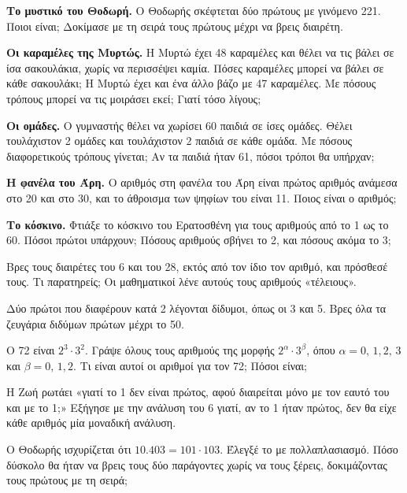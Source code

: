 \ex \textbf{Το μυστικό του Θοδωρή.} Ο Θοδωρής σκέφτεται δύο πρώτους με γινόμενο 221. Ποιοι είναι; Δοκίμασε με τη σειρά τους πρώτους μέχρι να βρεις διαιρέτη.

\ex \textbf{Οι καραμέλες της Μυρτώς.} Η Μυρτώ έχει 48 καραμέλες και θέλει να τις βάλει σε ίσα σακουλάκια, χωρίς να περισσέψει καμία. Πόσες καραμέλες μπορεί να βάλει σε κάθε σακουλάκι; Η Μυρτώ έχει και ένα άλλο βάζο με 47 καραμέλες. Με πόσους τρόπους μπορεί να τις μοιράσει εκεί; Γιατί τόσο λίγους;

\ex \textbf{Οι ομάδες.} Ο γυμναστής θέλει να χωρίσει 60 παιδιά σε ίσες ομάδες. Θέλει τουλάχιστον 2 ομάδες και τουλάχιστον 2 παιδιά σε κάθε ομάδα. Με πόσους διαφορετικούς τρόπους γίνεται; Αν τα παιδιά ήταν 61, πόσοι τρόποι θα υπήρχαν;

\ex \textbf{Η φανέλα του Άρη.} Ο αριθμός στη φανέλα του Άρη είναι πρώτος αριθμός ανάμεσα στο 20 και στο 30, και το άθροισμα των ψηφίων του είναι 11. Ποιος είναι ο αριθμός;

\ex \textbf{Το κόσκινο.} Φτιάξε το κόσκινο του Ερατοσθένη για τους αριθμούς από το 1 ως το 60. Πόσοι πρώτοι υπάρχουν; Πόσους αριθμούς σβήνει το 2, και πόσους ακόμα το 3;


\ex Βρες τους διαιρέτες του 6 και του 28, εκτός από τον ίδιο τον αριθμό, και πρόσθεσέ τους. Τι παρατηρείς; Οι μαθηματικοί λένε αυτούς τους αριθμούς «τέλειους».

\ex Δύο πρώτοι που διαφέρουν κατά 2 λέγονται δίδυμοι, όπως οι 3 και 5. Βρες όλα τα ζευγάρια διδύμων πρώτων μέχρι το 50.

\ex Ο 72 είναι $2^3\cdot 3^2$. Γράψε όλους τους αριθμούς της μορφής $2^{\alpha}\cdot 3^{\beta}$, όπου $\alpha=0,\,1,2,\,3$ και $\beta=0,\,1,2$. Τι είναι αυτοί οι αριθμοί για τον 72; Πόσοι είναι;

\ex Η Ζωή ρωτάει «γιατί το 1 δεν είναι πρώτος, αφού διαιρείται μόνο με τον εαυτό του και με το 1;» Εξήγησε με την ανάλυση του 6 γιατί, αν το 1 ήταν πρώτος, δεν θα είχε κάθε αριθμός μία μοναδική ανάλυση.

\ex Ο Θοδωρής ισχυρίζεται ότι $10.403=101\cdot 103$. Έλεγξέ το με πολλαπλασιασμό. Πόσο δύσκολο θα ήταν να βρεις τους δύο παράγοντες χωρίς να τους ξέρεις, δοκιμάζοντας τους πρώτους με τη σειρά;
